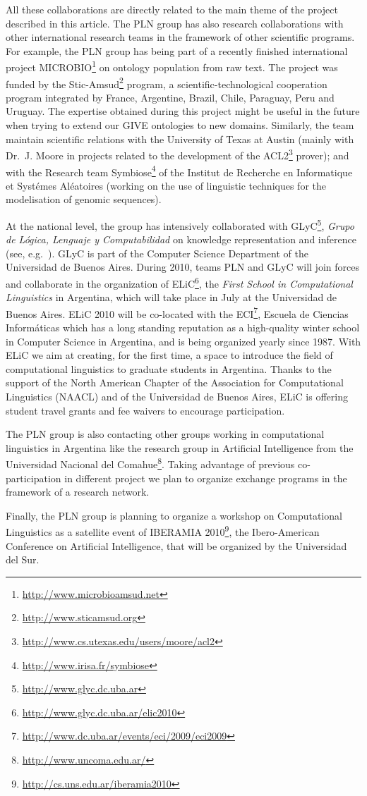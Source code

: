 All these collaborations are directly related to the main theme of the project 
described in this article.  The PLN group has also research collaborations with 
other international research teams in the framework of other scientific programs. 
For example, the PLN group has being part of a recently finished international project 
MICROBIO\footnote{\url{http://www.microbioamsud.net}} on ontology population from raw text.
The project was funded by the Stic-Amsud\footnote{\url{http://www.sticamsud.org}} program, 
a scientific-technological cooperation program integrated by France, Argentine, Brazil, 
Chile, Paraguay, Peru and Uruguay. The expertise obtained during this project might
be useful in the future when trying to extend our GIVE ontologies to new domains. 
Similarly, the team maintain scientific relations with the University of Texas at Austin
(mainly with Dr.\ J. Moore in projects related to the development of the ACL2\footnote{\url{http://www.cs.utexas.edu/users/moore/acl2}} prover); and with the 
Research team Symbiose\footnote{\url{http://www.irisa.fr/symbiose}} of the Institut de
Recherche en Informatique et Syst\'emes Al\'eatoires (working on the use of linguistic
techniques for the modelisation of genomic sequences).

At the national level, the group has intensively collaborated with GLyC\footnote{\url{http://www.glyc.dc.uba.ar}}, \emph{Grupo de L\'ogica,
Lenguaje y Computabilidad} on knowledge representation and inference 
(see, e.g.~\cite{AG06,AFFM08}). GLyC is part
of the Computer Science Department of the Universidad de Buenos Aires. 
During 2010, teams PLN and GLyC will join forces and collaborate in
the organization of ELiC\footnote{\url{http://www.glyc.dc.uba.ar/elic2010}}, 
the \emph{First School in Computational Linguistics} in Argentina,  which will
take place in July at the Universidad de Buenos Aires.  ELiC 2010 will be co-located 
with the ECI\footnote{\url{http://www.dc.uba.ar/events/eci/2009/eci2009}}, Escuela de Ciencias Inform\'aticas which has a
long standing reputation as a high-quality winter school in Computer Science in
Argentina, and is being organized yearly since 1987.
With ELiC we aim at creating, for the first time, a space to introduce the field of 
computational linguistics to graduate students in Argentina.  Thanks to the 
support of the North American Chapter of the Association for
Computational Linguistics (NAACL) and of the Universidad de Buenos Aires, 
ELiC is offering student travel grants and fee waivers to encourage participation.

The PLN group is also contacting other groups working in computational linguistics
in Argentina like the research group in Artificial Intelligence from the 
Universidad Nacional del Comahue\footnote{\url{http://www.uncoma.edu.ar/}}. Taking 
advantage of previous co-participation in different project we plan to organize
exchange programs in the framework of a research network. 

Finally, the PLN group is planning to organize a workshop on Computational
Linguistics as a satellite event of IBERAMIA 2010\footnote{\url{http://cs.uns.edu.ar/iberamia2010}}, 
the Ibero-American Conference on Artificial Intelligence, that will be organized by the Universidad
del Sur. 
